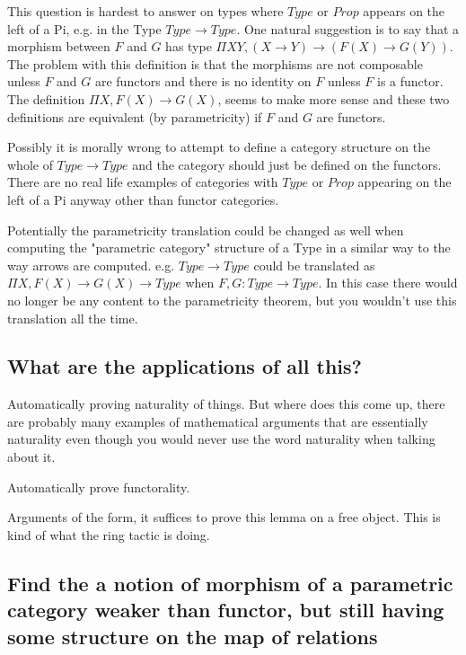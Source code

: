 \documentclass[12pt]{article} %
\theoremstyle{definition}
\theoremstyle{definition}
\theoremstyle{definition}
\theoremstyle{definition}
\begin{document}
This question is hardest to answer on types where $Type$ or $Prop$ appears on the left of a Pi,
e.g. in the Type $Type\rightarrow Type$. One natural suggestion is to say that a morphism between
$F$ and $G$ has type $\Pi X Y, (X \rightarrow Y) \rightarrow (F(X) \rightarrow G(Y))$. The problem 
with this definition is that the morphisms are not composable unless $F$ and $G$ are functors and 
there is no identity on $F$ unless $F$ is a functor. The definition $\Pi X, F(X) \rightarrow G(X)$,
seems to make more sense and these two definitions are equivalent (by parametricity) if $F$ and
$G$ are functors.

Possibly it is morally wrong to attempt to define a category structure on the whole of
$Type \rightarrow Type$ and the category should just be defined on the functors. 
There are no real life examples of categories with $Type$ or $Prop$ appearing on the left of a 
Pi anyway other than functor categories.

Potentially the parametricity translation could be changed as well when computing the 
"parametric category" structure of a Type in a similar way to the way arrows are computed.
e.g. $Type \rightarrow Type$ could be translated as 
$\Pi X, F(X) \rightarrow G(X) \rightarrow Type$ when $F,G : Type \rightarrow Type$. 
In this case there would no longer be any content to the parametricity theorem, but
you wouldn't use this translation all the time.



\subsection{What are the applications of all this?}

Automatically proving naturality of things. But where does this come up, there are probably many examples
of mathematical arguments that are essentially naturality even though you would never use the word naturality
when talking about it.

Automatically prove functorality.

Arguments of the form, it suffices to prove this lemma on a free object. 
This is kind of what the ring tactic is doing.

\subsection{Find the a notion of morphism of a parametric category weaker than functor, but
  still having some structure on the map of relations}
\end{document}
